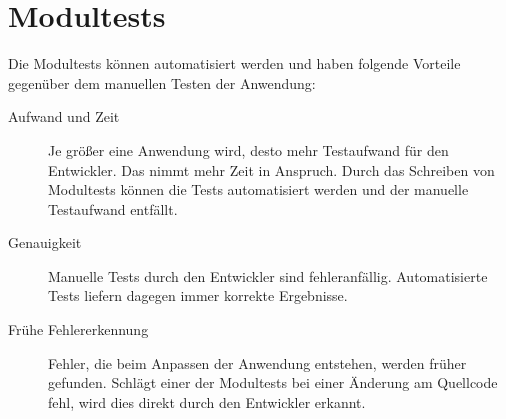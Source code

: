 \section{Modultests}\label{sec:unit-tests}

Die Modultests können automatisiert werden und haben folgende Vorteile gegenüber dem manuellen Testen der Anwendung:

\begin{description}
      \item[Aufwand und Zeit]
            Je größer eine Anwendung wird, desto mehr Testaufwand für den Entwickler. Das nimmt mehr Zeit in Anspruch.
            Durch das Schreiben von Modultests können die Tests automatisiert werden und der manuelle Testaufwand entfällt.
      \item[Genauigkeit]
            Manuelle Tests durch den Entwickler sind fehleranfällig. Automatisierte Tests liefern dagegen immer korrekte Ergebnisse.
      \item[Frühe Fehlererkennung]
            Fehler, die beim Anpassen der Anwendung entstehen, werden früher gefunden. Schlägt einer der
            Modultests bei einer Änderung am Quellcode fehl, wird dies direkt durch den Entwickler erkannt.
\end{description}
